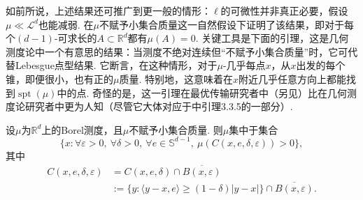 如前所说，上述结果还可推广到更一般的情形：$\ell$的可微性并非真正必要，假设$\mu\ll\mathscr L^d$也能减弱. \cite{b250}在$\mu$不赋予小集合质量这一自然假设下证明了该结果，即对于每个$(d-1)$-可求长的$A\subset\mathbb R^d$都有$\mu(A)=0$. 关键工具是下面的引理，这是几何测度论中一个有意思的结果：当测度不绝对连续但“不赋予小集合质量”时，它可代替Lebesgue点型结果. 它断言，在这种情形，对于$\mu$-几乎每点$x$，从$x$出发的每个锥，即便很小，也有正的$\mu$质量. 特别地，这意味着在$x$附近几乎任意方向上都能找到$\operatorname{spt}(\mu)$中的点. 奇怪的是，这一引理在最优传输研究者中（另见\cite{b121}）比在几何测度论研究者中更为人知（尽管它大体对应于\cite{b161}中引理3.3.5的一部分）.

\begin{lemma}\label{obj:3.28}
设$\mu$为$\mathbb R^d$上的Borel测度，且$\mu$不赋予小集合质量. 则$\mu$集中于集合
\[
\{x:\forall\varepsilon>0,\ \forall\delta>0,\ \forall e\in\mathbb S^{d-1},\ \mu(C(x,e,\delta,\varepsilon))>0\},
\]
其中
\begin{equation*}
\begin{aligned}
C(x,e,\delta,\varepsilon)&=C(x,e,\delta)\cap\overline{B(x,\varepsilon)}\\
&:=\{y:\langle y-x,e\rangle\ge(1-\delta)|y-x|\}\cap\overline{B(x,\varepsilon)}.
\end{aligned}
\end{equation*}
\end{lemma}
